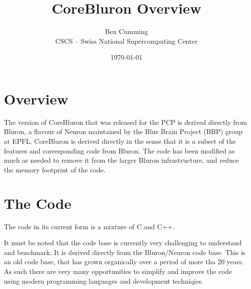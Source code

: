 \documentclass[11pt,a4paper]{article}
\begin{document}
\title{CoreBluron Overview}
\author{Ben Cumming\\CSCS -- Swiss National Supercomputing Center}
\date{\today}
\maketitle


\section{Overview}
The version of CoreBluron that was released for the PCP is derived directly from Bluron, a flavour of Neuron maintained by the Blue Brain Project (BBP) group at EPFL. CoreBluron is derived directly in the sense that it is a subset of the features and corresponding code from Bluron. The code has been modified as much as needed to remove it from the larger Bluron infrastructure, and reduce the memory footprint of the code.

\section{The Code}
The code in its current form is a mixture of C and C++.


It must be noted that the code base is currently very challenging to understand and benchmark. It is derived directly from the Bluron/Neuron code base. This is an old code base, that has grown organically over a period of more tha 20 years. As such there are very many opportunities to simplify and improve the code using modern programming languages and development techniqies.
\end{document}
